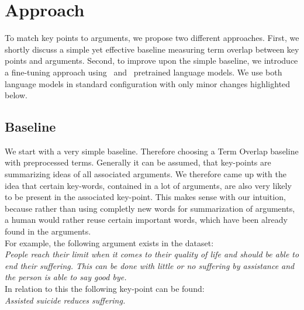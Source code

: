 \section{Approach}\label{approach}

To match key points to arguments, we propose two different approaches.
First, we shortly discuss a simple yet effective baseline measuring term overlap between key points and arguments.
Second, to improve upon the simple baseline, we introduce a fine-tuning approach using \Bert~\todocite and \Roberta~\todocite pretrained language models. We use both language models in standard configuration with only minor changes highlighted below.

\subsection{Baseline}

We start with a very simple baseline. Therefore choosing a Term Overlap baseline with preprocessed terms. 
Generally it can be assumed, that key-points are summarizing ideas of all associated arguments. We therefore came up with the idea
that certain key-words, contained in a lot of arguments, are also very likely to be present in the associated key-point. This makes 
sense with our intuition, because rather than using completly new words for summarization of arguments, a human would 
rather reuse certain important words, which have been already found in the arguments.\\
For example, the following argument exists in the \ArgKP dataset:\\
\textit{People reach their limit when it comes to 
their quality of life and should be able to end their {\color{blue} suffering}. This can be done with little 
or no {\color{blue} suffering} by {\color{orange} assistance} and the person is able to say good bye.}\\ 

In relation to this the following key-point can be found:\\
\textit{{\color{orange} Assisted} suicide reduces {\color{blue} suffering}.}\\

